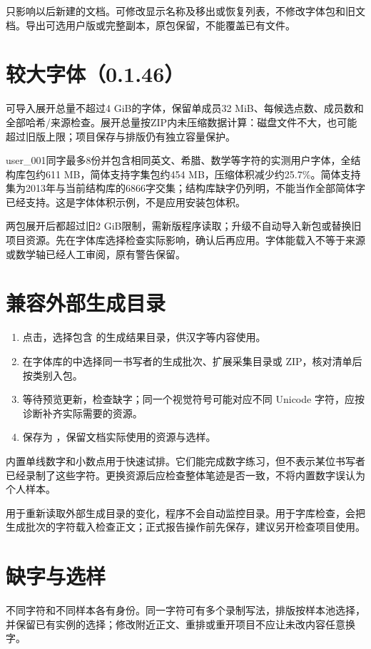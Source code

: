 只影响以后新建的文档。可修改显示名称及移出或恢复列表，不修改字体包和旧文档。导出可选用户版或完整副本，原包保留，不能覆盖已有文件。

\section{较大字体（0.1.46）}
可导入展开总量不超过4 GiB的字体，保留单成员32 MiB、每候选点数、成员数和全部哈希/来源检查。展开总量按ZIP内未压缩数据计算：磁盘文件不大，也可能超过旧版上限；项目保存与排版仍有独立容量保护。

user\_001同字最多8份并包含相同英文、希腊、数学等字符的实测用户字体，全结构库包约611 MB，简体支持字集包约454 MB，压缩体积减少约25.7\%。简体支持集为2013年与当前结构库的6866字交集；结构库缺字仍列明，不能当作全部简体字已经支持。这是字体体积示例，不是应用安装包体积。

两包展开后都超过旧2 GiB限制，需新版程序读取；升级不自动导入新包或替换旧项目资源。先在字体库选择检查实际影响，确认后再应用。字体能载入不等于来源或数学轴已经人工审阅，原有警告保留。

\section{兼容外部生成目录}
\begin{enumerate}
\item 点击，选择包含  的生成结果目录，供汉字等内容使用。
\item 在字体库的中选择同一书写者的生成批次、扩展采集目录或 ZIP，核对清单后按类别入包。
\item 等待预览更新，检查缺字；同一个视觉符号可能对应不同 Unicode 字符，应按诊断补齐实际需要的资源。
\item 保存为 ，保留文档实际使用的资源与选样。
\end{enumerate}

内置单线数字和小数点用于快速试排。它们能完成数字练习，但不表示某位书写者已经录制了这些字符。更换资源后应检查整体笔迹是否一致，不将内置数字误认为个人样本。

用于重新读取外部生成目录的变化，程序不会自动监控目录。用于字库检查，会把生成批次的字符载入检查正文；正式报告操作前先保存，建议另开检查项目使用。

\section{缺字与选样}
不同字符和不同样本各有身份。同一字符可有多个录制写法，排版按样本池选择，并保留已有实例的选择；修改附近正文、重排或重开项目不应让未改内容任意换字。


